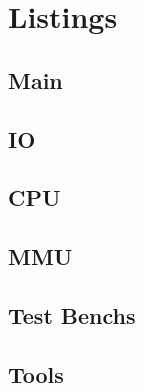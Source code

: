 \documentclass[a4paper, 12pt]{report}
\begin{document}
  \chapter*{Listings}
    \section*{Main}
      
    \newpage
    \section*{IO}
      
      
      
      
      
    \newpage
    \section*{CPU}
      
      
      
      
      
      
      
      
    \newpage
    \section*{MMU}
      
      
      
      
      
      
      
      
      
    \newpage
    \section*{Test Benchs}
      
      
      
      
      
      
    \newpage
    \section*{Tools}
      
      
\end{document}
